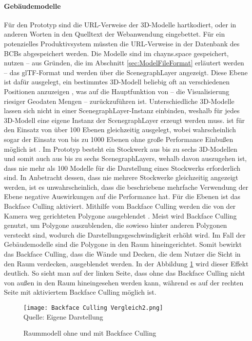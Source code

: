 \paragraph{Gebäudemodelle}
Für den Prototyp sind die \ac{URL}-Verweise der 3D-Modelle hartkodiert, oder in anderen Worten in den Quelltext der Webanwendung eingebettet. Für ein potenzielles Produktivsystem müssten die \ac{URL}-Verweise in der Datenbank des \ac{BCB}s abgespeichert werden. Die Modelle sind im chayns.space gespeichert, nutzen – aus Gründen, die im Abschnitt \ref{sec:ModelFileFormat} erläutert werden – das \ac{glTF}-Format und werden über die ScenegraphLayer angezeigt. Diese Ebene ist dafür ausgelegt, ein bestimmtes 3D-Modell beliebig oft an verschiedenen Positionen anzuzeigen \cite{DeckglScenegraphLayer}, was auf die Hauptfunktion von \deckgl{} – die Visualisierung riesiger Geodaten Mengen \cite[S.~3]{YangWang2019} – zurückzuführen ist. Unterschiedliche 3D-Modelle lassen sich nicht in einer ScenegraphLayer-Instanz einbinden, weshalb für jedes 3D-Modell eine eigene Instanz der ScenegraphLayer erzeugt werden muss. \deckgl{} ist für den Einsatz von über 100 Ebenen gleichzeitig ausgelegt, wobei wahrscheinlich sogar der Einsatz von bis zu 1000 Ebenen ohne große Performance Einbußen möglich ist \cite{DeckglPerformance}. Im Prototyp besteht ein Stockwerk aus bis zu sechs 3D-Modellen und somit auch aus bis zu sechs ScenegraphLayers, wehalb davon auszugehen ist, dass nie mehr als 100 Modelle für die Darstellung eines Stockwerks erforderlich sind. In Anbetracht dessen, dass nie mehrere Stockwerke gleichzeitig angezeigt werden, ist es unwahrscheinlich, dass die beschriebene mehrfache Verwendung der Ebene negative Auswirkungen auf die Performance hat. Für die Ebenen ist das Backface Culling aktiviert. Mithilfe vom Backface Culling werden die von der Kamera weg gerichteten Polygone ausgeblendet \cite{BackfaceCulling}. Meist wird Backface Culling genutzt, um Polygone auszublenden, die sowieso hinter anderen Polygonen versteckt sind, wodurch die Darstellungsgeschwindigkeit erhöht wird. Im Fall der Gebäudemodelle sind die Polygone in den Raum hineingerichtet. Somit bewirkt das Backface Culling, dass die Wände und Decken, die dem Nutzer die Sicht in den Raum verdecken, ausgeblendet werden. In der Abbildung \ref{fig:BackfaceCulling} wird dieser Effekt deutlich. So sieht man auf der linken Seite, dass ohne das Backface Culling nicht von außen in den Raum hineingesehen werden kann, während es auf der rechten Seite mit aktiviertem Backface Culling möglich ist.

\begin{figure}[H]
    \caption{Raummodell ohne und mit Backface Culling}\label{fig:BackfaceCulling}
    \texttt{[image: Backface Culling Vergleich2.png]}
    \\
    Quelle: Eigene Darstellung
\end{figure}

